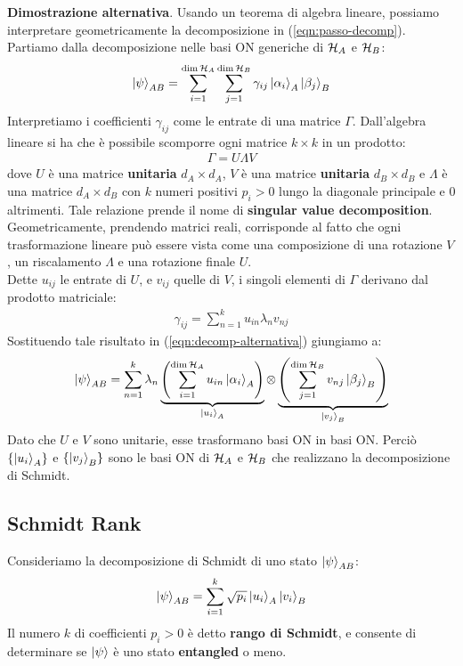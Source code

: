 \documentclass[../../InformazioneQuantistica.tex]{subfiles}
\begin{document}
\begin{expl}
\textbf{Dimostrazione alternativa}. Usando un teorema di algebra lineare, possiamo interpretare geometricamente la decomposizione in (\ref{eqn:passo-decomp}). Partiamo dalla decomposizione nelle basi ON generiche di $\mathcal{H}_A$ e $\mathcal{H}_B$:
\begin{align}
\Ket{\psi}_{AB} =\sum_{i=1}^{\operatorname{dim}\mathcal{H}_A} \sum_{j=1}^{\operatorname{dim}\mathcal{H}_B} \gamma_{ij} \Ket{\alpha_i}_A\Ket{\beta_j}_B
\label{eqn:decomp-alternativa}
\end{align}
Interpretiamo i coefficienti $\gamma_{ij}$ come le entrate di una matrice $\Gamma$. Dall'algebra lineare si ha che è possibile scomporre ogni matrice $k \times k$ in un prodotto:
\begin{align*}
\Gamma = U \Lambda V
\end{align*}
dove $U$ è una matrice \textbf{unitaria} $d_A \times d_A$, $V$ è una matrice \textbf{unitaria} $d_B \times d_B$ e $\Lambda$ è una matrice $d_A \times d_B$ con $k$ numeri positivi $p_i > 0$ lungo la diagonale principale e $0$ altrimenti. Tale relazione prende il nome di \textbf{singular value decomposition}. Geometricamente, prendendo matrici reali, corrisponde al fatto che ogni trasformazione lineare può essere vista come una composizione di una rotazione $V$, un riscalamento $\Lambda$ e una rotazione finale $U$.\\

Dette $u_{ij}$ le entrate di $U$, e $v_{ij}$ quelle di $V$, i singoli elementi di $\Gamma$ derivano dal prodotto matriciale: 
\begin{align*}
\gamma_{ij} = \sum_{n=1}^k u_{in}\lambda_n v_{nj}
\end{align*}
Sostituendo tale risultato in (\ref{eqn:decomp-alternativa}) giungiamo a:
\begin{align*}
\Ket{\psi}_{AB} = \sum_{n=1}^{k} \lambda_n\underbrace{ \left( \sum_{i=1}^{\operatorname{dim}\mathcal{H}_A} u_{in}\Ket{\alpha_i}_A\right)}_{\Ket{u_i}_A}\otimes\underbrace{ \left(\sum_{j=1}^{\operatorname{dim}\mathcal{H}_B} v_{nj}\Ket{\beta_j}_B\right)}_{\Ket{v_j}_B}
\end{align*}
Dato che $U$ e $V$ sono unitarie, esse trasformano basi ON in basi ON. Perciò $\{\Ket{u_i}_A\}$ e $\{\Ket{v_j}_B\}$ sono le basi ON di $\mathcal{H}_A$ e $\mathcal{H}_B$ che realizzano la decomposizione di Schmidt.
\end{expl}

\subsection{Schmidt Rank}
Consideriamo la decomposizione di Schmidt di uno stato $\Ket{\psi}_{AB}$:
\begin{align*}
\Ket{\psi}_{AB} = \sum_{i=1}^k \sqrt{p_i} \Ket{u_i}_A \Ket{v_i}_B
\end{align*}
Il numero $k$ di coefficienti $p_i > 0$ è detto \textbf{rango di Schmidt}, e consente di determinare se $\Ket{\psi}$ è uno stato \textbf{entangled} o meno.\\
\end{document}
